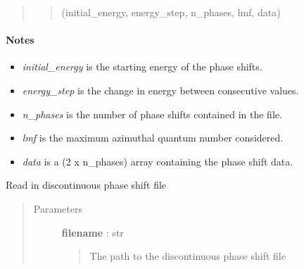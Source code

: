 \documentclass[letterpaper,10pt,english]{sphinxmanual}
\begin{document}
\begin{fulllineitems}
\begin{fulllineitems}
\begin{quote}
\begin{description}
\begin{quote}
(initial\_energy, energy\_step, n\_phases, lmf, data)
\end{quote}

\end{description}\end{quote}
\paragraph{Notes}
\begin{itemize}
\item {} 
\emph{initial\_energy} is the starting energy of the phase shifts.

\item {} 
\emph{energy\_step} is the change in energy between consecutive values.

\item {} 
\emph{n\_phases} is the number of phase shifts contained in the file.

\item {} 
\emph{lmf} is the maximum azimuthal quantum number considered.

\item {} 
\emph{data} is a (2 x n\_phases) array containing the phase shift data.

\end{itemize}

\end{fulllineitems}


\begin{fulllineitems}
\label{modules:phaseshifts.conphas.Conphas.read_datafile}
Read in discontinuous phase shift file
\begin{quote}\begin{description}
\item[{Parameters}] \leavevmode
\textbf{filename} : str
\begin{quote}

The path to the discontinuous phase shift file
\end{quote}

\end{description}\end{quote}

\end{fulllineitems}



\end{fulllineitems}
\end{document}
